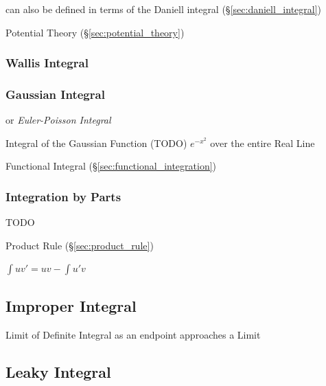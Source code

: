 {can also be defined in terms of the Daniell integral
(\S\ref{sec:daniell_integral})

Potential Theory (\S\ref{sec:potential_theory})



\subsubsection{Wallis Integral}\label{sec:wallis_integral}

\subsubsection{Gaussian Integral}\label{sec:gaussian_integral}

or \emph{Euler-Poisson Integral}

Integral of the Gaussian Function (TODO) $e^{-x^2}$ over the entire Real Line

\fist Functional Integral (\S\ref{sec:functional_integration})



\subsubsection{Integration by Parts}\label{sec:integration_by_parts}

TODO

\fist Product Rule (\S\ref{sec:product_rule})

$\int{uv'} = uv - \int{u'v}$



\subsection{Improper Integral}\label{sec:improper_integral}

Limit of Definite Integral as an endpoint approaches a Limit



\subsection{Leaky Integral}\label{sec:leaky_integral}

}
